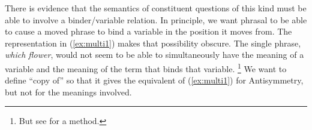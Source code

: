 \documentclass[output=paper]{langsci/langscibook}
\begin{document}
\ea\label{ex:multi1}
\z
%

There is evidence that the semantics of constituent questions of this kind must be able to involve a binder/variable relation. In principle, we want phrasal  to be able to cause a moved phrase to bind a variable in the position it moves from. The representation in (\ref{ex:multi1}) makes that possibility obscure. The single phrase, \emph{which flower}, would not seem to be able to simultaneously have the meaning of a variable and the meaning of the term that binds that variable.%
\footnote{But see \cite{Engdahl1986} for a method.} %
We want to define ``copy of'' so that it gives the equivalent of (\ref{ex:multi1}) for Antisymmetry, but not for the meanings involved.
\end{document}
